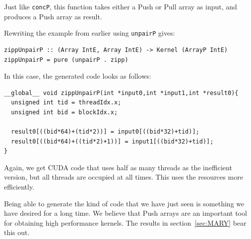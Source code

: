 \documentclass[]{sigplanconf}
\begin{document}
\noindent
Just like {\tt concP}, this function takes either a Push or Pull array 
as input, and produces a Push array as result. 

Rewriting the example from earlier using {\tt unpairP} gives:

\begin{codesize}
\begin{verbatim}
zippUnpairP :: (Array IntE, Array IntE) -> Kernel (ArrayP IntE) 
zippUnpairP = pure (unpairP . zipp)
\end{verbatim}
\end{codesize}

\noindent
In this case, the generated code looks as follows: 

\begin{codesize}
\begin{verbatim}
__global__ void zippUnpairP(int *input0,int *input1,int *result0){
  unsigned int tid = threadIdx.x;
  unsigned int bid = blockIdx.x;
  
  result0[((bid*64)+(tid*2))] = input0[((bid*32)+tid)];
  result0[((bid*64)+((tid*2)+1))] = input1[((bid*32)+tid)];
}
\end{verbatim}
\end{codesize}

\noindent
Again, we get CUDA code that uses half as many threads as the inefficient 
version, but all threads are occupied at all times. This uses
the resources more efficiently. 


Being able to generate the kind of code that we have just seen is something we have desired for a long time. We believe that 
Push arrays are an important tool for obtaining high performance kernels. The results 
in section~\ref{sec:MARY} bear this out. 





















\end{document}
